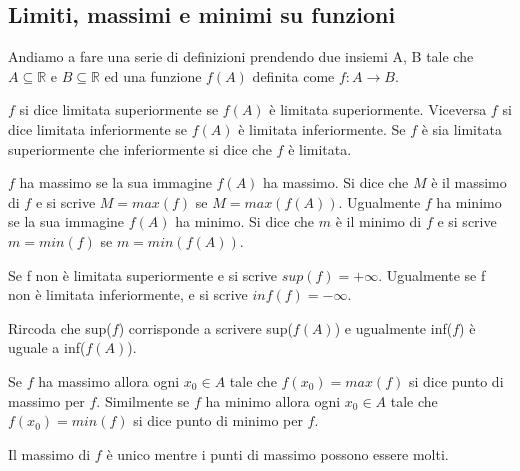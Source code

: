\subsection{Limiti, massimi e minimi su funzioni}
Andiamo a fare una serie di definizioni prendendo due insiemi A, B tale che $A \subseteq \mathbb{R}$ e $B \subseteq \mathbb{R}$ ed una funzione $f(A)$ definita come $f: A \longrightarrow B$.
\begin{definition}
    $f$ si dice limitata superiormente se $f(A)$ è limitata superiormente. Viceversa $f$ si dice limitata inferiormente se $f(A)$ è limitata inferiormente. Se $f$ è sia limitata superiormente che inferiormente si dice che $f$ è limitata.
\end{definition}
\begin{definition}
    $f$ ha massimo se la sua immagine $f(A)$ ha massimo. Si dice che $M$ è il massimo di $f$ e si scrive $M = max(f)$ se $M = max(f(A))$. Ugualmente $f$ ha minimo se la sua immagine $f(A)$ ha minimo. Si dice che $m$ è il minimo di $f$ e si scrive $m = min(f)$ se $m = min(f(A))$.
\end{definition}
\begin{definition}
    Se f non è limitata superiormente e si scrive $sup(f) = +\infty$. Ugualmente se f non è limitata inferiormente, e si scrive $inf(f) = -\infty$.
\end{definition}
\begin{note}
    Rircoda che sup($f$) corrisponde a scrivere sup($f(A)$) e ugualmente inf($f$) è uguale a inf($f(A)$).
\end{note}
\begin{definition}
    Se $f$ ha massimo allora ogni $x_0 \in A$ tale che $f(x_0) = max(f)$ si dice punto di massimo per $f$. Similmente se $f$ ha minimo allora ogni $x_0 \in A$ tale che $f(x_0) = min(f)$ si dice punto di minimo per $f$.
\end{definition}
\begin{observation}
    Il massimo di $f$ è unico mentre i punti di massimo possono essere molti.
\end{observation}

